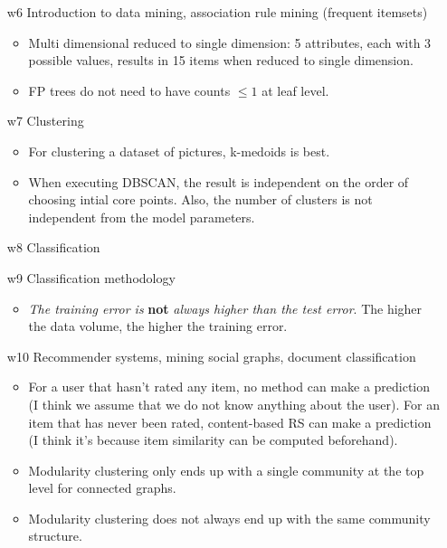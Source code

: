 \begin{enumerate}
	\item[w6] Introduction to data mining, association rule mining (frequent itemsets)
	\begin{itemize}
		\item Multi dimensional reduced to single dimension: 5 attributes, each with 3 possible values, results in 15 items when reduced to single dimension.
		\item FP trees do not need to have counts $\leq 1$ at leaf level.
	\end{itemize}
	\item[w7] Clustering
	\begin{itemize}
		\item For clustering a dataset of pictures, k-medoids is best.
		\item When executing DBSCAN, the result is independent on the order of choosing intial core points. Also, the number of clusters is not independent from the model parameters.
	\end{itemize}
	\item[w8] Classification
	\item[w9] Classification methodology
	\begin{itemize}
		\item \emph{The training error is} \textbf{not} \emph{always higher than the test error}. The higher the data volume, the higher the training error.
	\end{itemize}
	\item[w10] Recommender systems, mining social graphs, document classification
    \begin{itemize}
        \item For a user that hasn't rated any item, no method can make a prediction (I think we assume that we do not know anything about the user). For an item that has never been rated, content-based RS can make a prediction (I think it's because item similarity can be computed beforehand).
        \item Modularity clustering only ends up with a single community at the top level for connected graphs.
        \item Modularity clustering does not always end up with the same community structure.
    \end{itemize}
\end{enumerate}
